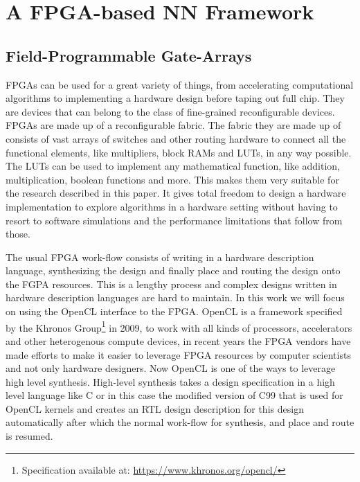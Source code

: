 \documentclass[techrep,english]{ipsj} %
\begin{document}
\section{A FPGA-based NN Framework}\label{sec:framework}
\subsection{Field-Programmable Gate-Arrays}
FPGAs can be used for a great variety of things, from accelerating computational algorithms to implementing a hardware design before taping out full chip.
They are devices that can belong to the class of fine-grained reconfigurable devices.\\
FPGAs are made up of a reconfigurable fabric.
The fabric they are made up of consists of vast arrays of switches and other routing hardware to connect all the functional elements, like multipliers, block RAMs and LUTs, in any way possible.
The LUTs can be used to implement any mathematical function, like addition, multiplication, boolean functions and more.
This makes them very suitable for the research described in this paper.
It gives total freedom to design a hardware implementation to explore algorithms in a hardware setting without having to resort to software simulations and the performance limitations that follow from those.

The usual FPGA work-flow consists of writing in a hardware description language, synthesizing the design and finally place and routing the design onto the FGPA resources.
This is a lengthy process and complex designs written in hardware description languages are hard to maintain.
In this work we will focus on using the OpenCL interface to the FPGA.
OpenCL is a framework specified by the Khronos Group\footnote{Specification available at: \url{https://www.khronos.org/opencl/}} in 2009, to work with all kinds of processors, accelerators and other heterogenous compute devices, in recent years the FPGA vendors have made efforts to make it easier to leverage FPGA resources by computer scientists and not only hardware designers.
Now OpenCL is one of the ways to leverage high level synthesis.
High-level synthesis takes a design specification in a high level language like C or in this case the modified version of C99 that is used for OpenCL kernels and creates an RTL design description for this design automatically after which the normal work-flow for synthesis, and place and route is resumed.
\end{document}
